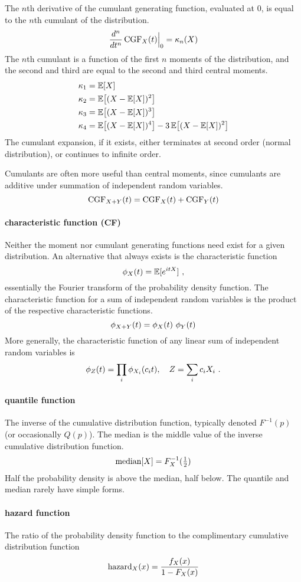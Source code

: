 The $n$th derivative of the cumulant generating function, evaluated at $0$, is equal to the $n$th cumulant of the distribution. 
\[
\frac{d^n}{dt^n}\operatorname{CGF}_X(t)\Big|_0 = \kappa_n(X)  
\]
The $n$th cumulant is a function of the first $n$ moments of the distribution, and the second and third are equal to the second and third central moments.
\begin{align*}
\kappa_1 &= \expect[X] \checked \\
\kappa_2 &= \expect\Left[ (X-\expect[X])^2 \Right] \checked\\
\kappa_3 &= \expect\Left[ (X-\expect[X])^3 \Right] \checked \\
\kappa_4 &= \expect\Left[ (X-\expect[X])^4 \Right] - 3 \expect\Left[ (X-\expect[X])^2 \Right] \checked
\end{align*}
The cumulant expansion, if it exists, either terminates at second order (normal distribution), or continues to infinite order.

Cumulants are often more useful than central moments, since cumulants are additive under summation of independent random variables. 
\[
\op{CGF}_{X+Y}(t) = \op{CGF}_{X}(t) + \op{CGF}_{Y}(t) 
\checked
\notag
\]


\paragraph*{characteristic function (CF)} 
\label{characteristic_function}
Neither the moment nor cumulant generating functions need exist for a given distribution. An alternative that always exists is the characteristic function
\[
\phi_X(t) = \operatorname{\mathbb E}[e^{i t X}]  \ , 
\notag
\]
essentially the Fourier transform of the probability density function. The characteristic function for a  sum of independent random variables is the product of the respective characteristic functions. 
\[
\phi_{ X+ Y}(t) = \phi_{X}( t)\  \phi_{Y}(t) 
\checked
\notag
\]
More generally, the characteristic function of any linear sum of independent random variables is
\[
\phi_{Z}(t) = \prod_i \phi_{X_i}(c_i t), \quad Z = \sum_i c_i X_i \ .
\checked
\notag
\]


\paragraph*{quantile function} 
The inverse of the cumulative distribution function, typically denoted  $F^{-1}(p)$ (or occasionally
 $Q(p)$).
 The median is the middle value of the inverse cumulative distribution function. 
\[
\operatorname{median}[X] = F_X^{-1}(\tfrac{1}{2}) 
\notag
\]
Half the probability density is above the median, half below. 
The quantile and median rarely have simple forms.


\paragraph*{hazard function}
The ratio of the probability density function to the complimentary cumulative distribution function
\[
\operatorname{hazard}_X(x) = \frac{f_X(x)}{1-F_X(x)} 
\notag
\]


